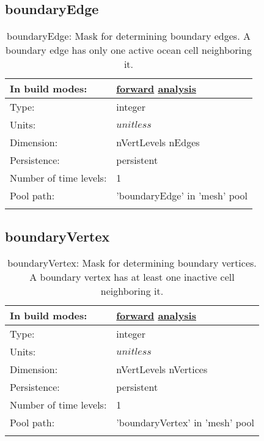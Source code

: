 \subsection[boundaryEdge]{boundaryEdge}
\label{subsec:var_sec_mesh_boundaryEdge}
\begin{center}
\begin{longtable}{| p{2.0in} | p{4.0in} |}
        \hline 
        In build modes: & \hyperref[subsec:forward_var_tab_mesh]{forward} \hyperref[subsec:analysis_var_tab_mesh]{analysis} \\
        \hline 
        Type: & integer \\
        \hline 
        Units: & $unitless$ \\
        \hline 
        Dimension: & nVertLevels nEdges \\
        \hline 
        Persistence: & persistent \\
        \hline 
        Number of time levels: & 1 \\
        \hline 
            Pool path: & 'boundaryEdge' in 'mesh' pool
 \\
		 \hline 
    \caption{boundaryEdge: Mask for determining boundary edges. A boundary edge has only one active ocean cell neighboring it.}
\end{longtable}
\end{center}
\subsection[boundaryVertex]{boundaryVertex}
\label{subsec:var_sec_mesh_boundaryVertex}
\begin{center}
\begin{longtable}{| p{2.0in} | p{4.0in} |}
        \hline 
        In build modes: & \hyperref[subsec:forward_var_tab_mesh]{forward} \hyperref[subsec:analysis_var_tab_mesh]{analysis} \\
        \hline 
        Type: & integer \\
        \hline 
        Units: & $unitless$ \\
        \hline 
        Dimension: & nVertLevels nVertices \\
        \hline 
        Persistence: & persistent \\
        \hline 
        Number of time levels: & 1 \\
        \hline 
            Pool path: & 'boundaryVertex' in 'mesh' pool
 \\
		 \hline 
    \caption{boundaryVertex: Mask for determining boundary vertices. A boundary vertex has at least one inactive cell neighboring it.}
\end{longtable}
\end{center}

